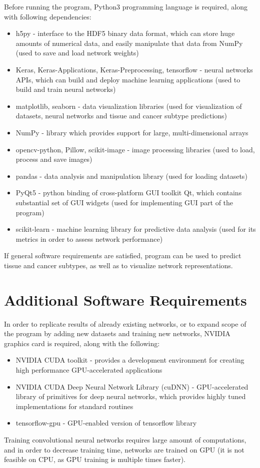 Before running the program, Python3 programming language is required, along with following dependencies: 
\begin{itemize}
	\itemsep 0em
	\item h5py - interface to the HDF5 binary data format, which can store huge amounts of numerical data, and easily manipulate that data from NumPy (used to save and load network weights)
	\item Keras, Keras-Applications, Keras-Preprocessing, tensorflow - neural networks APIs, which can build and deploy machine learning applications (used to build and train neural networks)
	\item matplotlib, seaborn - data visualization libraries (used for visualization of datasets, neural networks and tissue and cancer subtype predictions)
	\item NumPy - library which provides support for large, multi-dimensional arrays
	\item opencv-python, Pillow, scikit-image - image processing libraries (used to load, process and save images)
	\item pandas - data analysis and manipulation library (used for loading datasets)
	\item PyQt5 - python binding of cross-platform GUI toolkit Qt, which contains substantial set of GUI widgets (used for implementing GUI part of the program)
	\item scikit-learn - machine learning library for predictive data analysis (used for its metrics in order to assess network performance)
\end{itemize}
If general software requirements are satisfied, program can be used to predict tissue and cancer subtypes, as well as to visualize network representations.

\section{Additional Software Requirements}

In order to replicate results of already existing networks, or to expand scope of the program by adding new datasets and training new networks, NVIDIA graphics card is required, along with the following:
\begin{itemize}
	\itemsep 0em
	\item NVIDIA CUDA toolkit - provides a development environment for creating high performance GPU-accelerated applications
	\item NVIDIA CUDA Deep Neural Network Library (cuDNN) - GPU-accelerated library of primitives for deep neural networks, which provides highly tuned implementations for standard routines
	\item tensorflow-gpu - GPU-enabled version of tensorflow library
\end{itemize}
Training convolutional neural networks requires large amount of computations, and in order to decrease training time, networks are trained on GPU (it is not feasible on CPU, as GPU training is multiple times faster).

